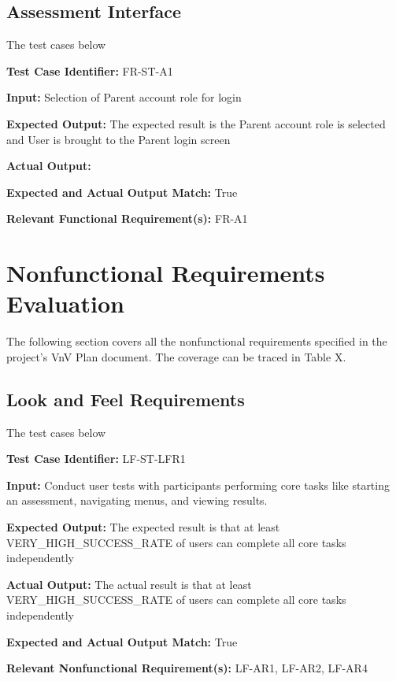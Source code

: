 \documentclass[12pt, titlepage]{article}
\begin{document}
\subsection{Assessment Interface}
\hspace{2em}The test cases below 

\begin{mdframed}[linewidth=0.5mm] \par
  \textbf{Test Case Identifier:} FR-ST-A1 \par
  \textbf{Input:} Selection of Parent account role for login \par
  \textbf{Expected Output:} The expected result is the Parent account role is selected and User is brought to the Parent login screen \par
  \textbf{Actual Output:} \par
  \textbf{Expected and Actual Output Match:} True \par
  \textbf{Relevant Functional Requirement(s):} FR-A1
\end{mdframed}

\section{Nonfunctional Requirements Evaluation}
\hspace{2em}The following section covers all the nonfunctional requirements specified in the project’s
VnV Plan document. The coverage can be traced in Table X.

\subsection{Look and Feel Requirements}
\hspace{2em}The test cases below 

\begin{mdframed}[linewidth=0.5mm] \par
  \textbf{Test Case Identifier:} LF-ST-LFR1 \par
  \textbf{Input:} Conduct user tests with participants performing core tasks like starting an assessment, navigating menus, and viewing results. \par
  \textbf{Expected Output:} The expected result is that at least \\VERY\_HIGH\_SUCCESS\_RATE of users can complete all core tasks independently \par
  \textbf{Actual Output:} The actual result is that at least \\VERY\_HIGH\_SUCCESS\_RATE of users can complete all core tasks independently \par
  \textbf{Expected and Actual Output Match:} True \par
  \textbf{Relevant Nonfunctional Requirement(s):} LF-AR1, LF-AR2, LF-AR4
\end{mdframed}
\end{document}
